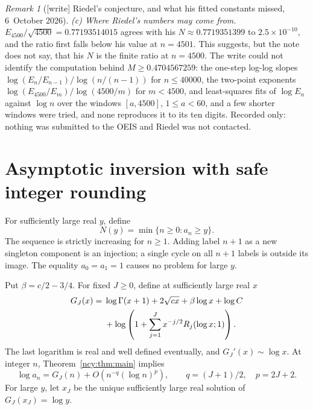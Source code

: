 \documentclass[11pt,letterpaper]{article}
\numberwithin{equation}{section}
\theoremstyle{remark}\newtheorem{remark}[theorem]{Remark}
\theoremstyle{definition}\newtheorem{definition}[theorem]{Definition}\theoremstyle{plain}
\begin{document}
\begin{remark}[{[write]} Riedel's conjecture, and what his fitted constants missed, 6~October 2026]
\emph{(c) Where Riedel's numbers may come from.}
$E_{4500}/\sqrt{4500}=0.77193514015$ agrees with his $N\approx0.7719351399$
to $2.5\times10^{-10}$, and the ratio first falls below his value at
$n=4501$. This suggests, but the note does not say, that his $N$ is the
finite ratio at $n=4500$. The write could not identify the computation behind
$M\ge0.4704567259$: the one-step log-log slopes
$\log(E_n/E_{n-1})/\log(n/(n-1))$ for $n\le40000$, the two-point exponents
$\log(E_{4500}/E_m)/\log(4500/m)$ for $m<4500$, and least-squares fits of
$\log E_n$ against $\log n$ over the windows $[a,4500]$, $1\le a<60$, and a
few shorter windows were tried, and none reproduces it to its ten digits. Recorded only: nothing was submitted to the OEIS and
Riedel was not contacted.
\end{remark}

\section{Asymptotic inversion with safe integer rounding}\label{ncy:sec:inverse}
For sufficiently large real $y$, define
\[
 N(y)=\min\{n\geq0:a_n\geq y\}.
\]
The sequence is strictly increasing for $n\geq1$. Adding label $n+1$
as a new singleton component is an injection; a single cycle on all
$n+1$ labels is outside its image. The equality $a_0=a_1=1$ causes
no problem for large $y$.

Put $\beta=c/2-3/4$. For fixed $J\geq0$, define at sufficiently large
real $x$
\begin{align}\label{ncy:eq:G}
 G_J(x)={}&\log\Gamma(x+1)+2\sqrt{cx}+\beta\log x+\log C\notag\\
 &+\log\left(1+\sum_{j=1}^Jx^{-j/2}R_j(\log x;1)\right).
\end{align}
The last logarithm is real and well defined eventually, and
$G_J'(x)\sim\log x$. At integer $n$, Theorem~\ref{ncy:thm:main} implies
\begin{equation}\label{ncy:eq:logerror}
 \log a_n=G_J(n)+O(n^{-q}(\log n)^p),\qquad
 q=(J+1)/2,\quad p=2J+2.
\end{equation}
For large $y$, let $x_J$ be the unique sufficiently large real solution
of $G_J(x_J)=\log y$.
\end{document}
